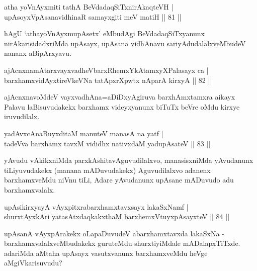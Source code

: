 \begin{shl}
atha yoV\s nAyxmiti tathA BeVdadaqSiTxnirAkaqteVH |\\
upAsoyxVpAsanavidhinaR samayxgiti meV matiH \hfill || 81 ||
\end{shl}

\begin{artha}
hAgU `athayoV\s nAyxmupAsetx' eMbudAgi BeVdadaqSiTxyanunx nirAkarisidadxriMda upAsayx, upAsana vidhAnavu sariyAdudalalxveMbudeV nananx aBipArxyavu.
\end{artha}

\begin{shl}
ajAcnxnamAtarxvayxvadheVbarxRhemxYkAtamxyXPalasayx ca |\\
barxhamxvidAyxtireVkeVNa tatApxrXpwtx nAparA kirxyA \hfill || 82 ||
\end{shl}

\begin{artha}
ajAcnxnavoMdeV vayxvadhAna=aDiDxyAgiruva barxhAmxtamxra aikayx Palavu laBisuvudakekx barxhamx videyxyanunx biTuTx beVre oMdu kirxye iruvudilalx.
\end{artha}

  
  \begin{shl}
yadAvxcA\s naBuyxditaM manuteV manasA na yatf |\\
tadeVva barxhamx tavxM vididhx  nativxdaM yadupAsateV \hfill || 83 ||
\end{shl}

\begin{artha}
yAvudu vAkikxniMda parxkAshitavAguvudilalxvo, manasisxniMda yAvudanunx tiLiyuvudakekx (manana mADuvudakekx) Aguvudilalxvo adanenx barxhamxveMdu niVnu tiLi, Adare yAvudanunx upAsane mADuvudo adu barxhamxvalalx.
\end{artha}

\begin{shl}
upAsikirxyayA vAyxpitxrabarxhamxtavxsayx lakaSxNamf |\\
shurxtAyx\s kAri yatasAtxdaqkakxthaM barxhemxVtuyxpAsayxteV \hfill || 84 ||
\end{shl}

\begin{artha}
upAsanA vAyxpArakekx oLapaDuvudeV abarxhamxtavxda lakaSxNa - barxhamxvalalxveMbudakekx guruteMdu shurxtiyiMdale mADalapxTiTxde. adariMda aMtaha upAsayx vasutxvanunx barxhamxveMdu heVge aMgiVkarisuvudu?
\end{artha}

